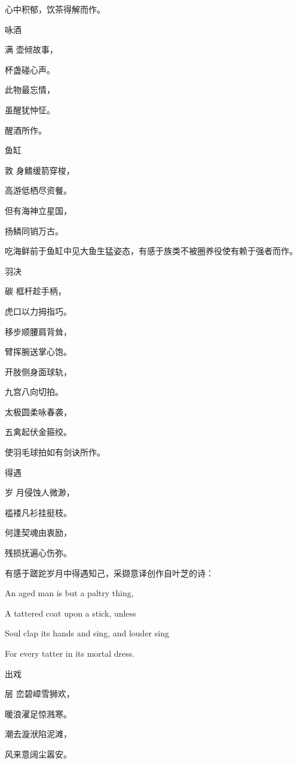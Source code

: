 \documentclass{article}
\newenvironment{poem}[3]{
\begin{minipage}{\textwidth}
\begin{pinyinscope}\begin{center}\Large\linespread{1.4}\selectfont #2\end{center}\end{pinyinscope}
\begin{pinyinscope}
	\begin{center}
	\Large\linespread{1.4}\rmfamily\selectfont #3
}{\end{center}
\end{pinyinscope}
\end{minipage}
}
\begin{document}
心中积郁，饮茶得解而作。

\begin{poem}{}{咏酒}
满壶倾故事，

杯盏碰心声。

此物最忘情，

虽醒犹忡怔。
\end{poem}

醒酒所作。

\begin{poem}{}{鱼缸}
敦身鳍缓箭穿梭，

高游低栖尽资餐。

但有海神立星国，

扬鳞同销万古{}。
\end{poem}

吃海鲜前于鱼缸中见大鱼生猛姿态，有感于族类不被圈养役使有赖于强者而作。

\begin{poem}{}{羽决}
碳框{}杆趁手柄，

虎口以力拇指巧。

移步顺腰肩背耸，

臂挥腕送掌心饱。

开肢侧身面球轨，

九宫八向切拍{}。

太极圆柔咏春袭，

五禽起伏金箍绞。
\end{poem}

使羽毛球拍如有剑诀所作。

\begin{poem}{}{得遇}
岁月侵蚀人微渺，

褴褛凡衫挂挺枝。

何逢契魂由衷励，

残损抚遍心伤弥。
\end{poem}

有感于蹉跎岁月中得遇知己，采撷意译创作自叶芝的诗：

\begin{displayquote}
An aged man is but a paltry thing,

A tattered coat upon a stick, unless

Soul clap its hands and sing, and louder sing

For every tatter in its mortal dress.
\end{displayquote}

\begin{poem}{}{出戏}
层峦碧嶂雪狮欢，

暖浪濯足惊溅寒。

潮去漩{\textsf 洑}陷泥滩，

风来意阔尘嚣安。
\end{poem}
\end{document}

